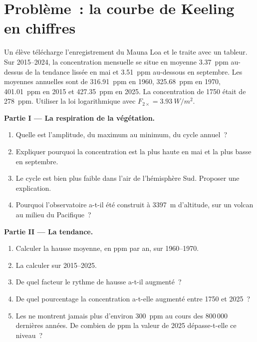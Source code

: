 \section{Problème~: la courbe de Keeling en chiffres}

\begin{problem}
\label{pb:g12:climate-change:1}
Un élève télécharge l'enregistrement du Mauna Loa et le traite avec un
tableur. Sur 2015--2024, la concentration mensuelle se situe en moyenne
\qty{3.37}{ppm} au-dessus de la tendance lissée en mai et \qty{3.51}{ppm}
au-dessous en septembre. Les moyennes annuelles sont de \qty{316.91}{ppm}
en 1960, \qty{325.68}{ppm} en 1970, \qty{401.01}{ppm} en 2015 et
\qty{427.35}{ppm} en 2025. La concentration de 1750 était de
\qty{278}{ppm}. Utiliser la loi logarithmique avec
$F_{2\times} = \qty{3.93}{W/m^2}$.

\medskip
\noindent\textbf{Partie I --- La respiration de la végétation.}
\begin{enumerate}
  \item Quelle est l'amplitude, du maximum au minimum, du cycle annuel~?
  \item Expliquer pourquoi la concentration est la plus haute en mai et la
        plus basse en septembre.
  \item Le cycle est bien plus faible dans l'air de l'hémisphère Sud.
        Proposer une explication.
  \item Pourquoi l'observatoire a-t-il été construit à \qty{3397}{m}
        d'altitude, sur un volcan au milieu du Pacifique~?
\end{enumerate}

\medskip
\noindent\textbf{Partie II --- La tendance.}
\begin{enumerate}[resume]
  \item Calculer la hausse moyenne, en ppm par an, sur 1960--1970.
  \item La calculer sur 2015--2025.
  \item De quel facteur le rythme de hausse a-t-il augmenté~?
  \item De quel pourcentage la concentration a-t-elle augmenté entre 1750
        et 2025~?
  \item Les  ne montrent jamais plus d'environ
        \qty{300}{ppm} au cours des 800\,000 dernières années. De combien
        de ppm la valeur de 2025 dépasse-t-elle ce niveau~?
\end{enumerate}


\end{problem}
